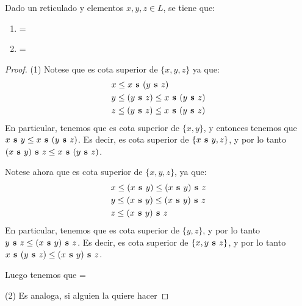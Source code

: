 \begin{lemma}
  Dado un reticulado \reticul y elementos $x, y, z \in L$, se tiene que:
  \begin{enumerate}
    \item {} = 
    \item {} = 
  \end{enumerate}
\end{lemma}
\begin{proof}
  (1) Notese que  es cota superior de $\{x, y, z\}$ ya que:
  \begin{alignat*}{3}
    & x \leq x\textbf{ s }(y\textbf{ s }z)\\
    & y \leq (y\textbf{ s }z) \leq x\textbf{ s }(y\textbf{ s }z)\\
    & z \leq (y\textbf{ s }z) \leq x\textbf{ s }(y\textbf{ s }z)
  \end{alignat*}
  En particular, tenemos que  es cota superior de $\{x, y\}$, y entonces tenemos que
  $x\textbf{ s }y \leq x\textbf{ s }(y\textbf{ s }z)$. Es decir,  es cota superior de $\{x\textbf{ s }y, z\}$, y por lo tanto 
  $(x\textbf{ s }y)\textbf{ s }z \leq x\textbf{ s }(y\textbf{ s }z)$.

  Notese ahora que  es cota superior de $\{x, y, z\}$, ya que:
  \begin{alignat*}{3}
    & x \leq (x\textbf{ s }y) \leq (x\textbf{ s }y)\textbf{ s }z\\
    & y \leq (x\textbf{ s }y) \leq (x\textbf{ s }y)\textbf{ s }z\\
    & z \leq (x\textbf{ s }y)\textbf{ s }z\\
  \end{alignat*}
  En particular, tenemos que  es cota superior de $\{y, z\}$, y por lo tanto $y\textbf{ s }z \leq (x\textbf{ s }y)\textbf{ s }z$.
  Es decir,  es cota superior de $\{x, y\textbf{ s }z\}$, y por lo tanto $x\textbf{ s }(y\textbf{ s }z) \leq (x\textbf{ s }y)\textbf{ s }z$.
  
  Luego tenemos que  = 

  (2) Es analoga, si alguien la quiere hacer
\end{proof}

